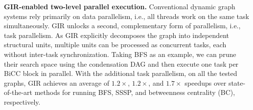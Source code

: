 \textbf{GIR-enabled two-level parallel execution.}
Conventional dynamic graph systems rely primarily on data parallelism,
i.e., all threads work
on the same task simultaneously.
GIR unlocks a second, complementary form of parallelism, i.e., task parallelism.
As GIR explicitly decomposes the graph into independent structural units, multiple
units can be processed as concurrent tasks, each without inter-task synchronization.
Taking BFS as an example,
we can prune their search space using the condensation DAG and then execute one task per BiCC block in parallel.
With the additional task parallelism, 
on all the tested graphs, GIR achieves an average of $1.2\times$, $1.2\times$, and $1.7\times$ speedups over state-of-the-art methods for running BFS, SSSP, and betweenness centrality (BC), respectively.








